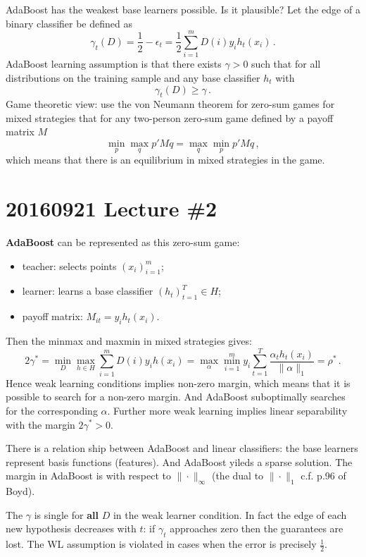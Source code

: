 \documentclass[a4paper]{article}
\begin{document}
AdaBoost has the weakest base learners possible. Is it plausible? Let the edge of
a binary classifier be defined as 
\[\gamma_t(D)
    = \frac{1}{2} - \epsilon_t
    = \frac{1}{2} \sum_{i=1}^m D(i) y_i h_t(x_i)
    \,.\]
AdaBoost learning assumption is that there exists $\gamma>0$ such that for all
distributions on the training sample and any base classifier $h_t$ with 
\[\gamma_t(D) \geq \gamma \,.\]
Game theoretic view: use the von Neumann theorem for zero-sum games for mixed strategies
that for any two-person zero-sum game defined by a payoff matrix $M$
\[\min_p \max_q p'Mq = \max_q \min_p p'Mq \,, \]
which means that there is an equilibrium in mixed strategies in the game.



\section{20160921 Lecture \#2} %
\label{sec:20160921_lecture_2}

\textbf{AdaBoost} can be represented as this zero-sum game:
\begin{itemize}
    \item teacher: selects points $(x_i)_{i=1}^m$;
    \item learner: learns a base classifier $(h_t)_{t=1}^T \in H$;
    \item payoff matrix: $M_{it} = y_i h_t(x_i)$.
\end{itemize}
Then the minmax and maxmin in mixed strategies gives:
\[ 2\gamma^*
    = \min_D \max_{h\in H} \sum_{i=1}^m D(i) y_i h(x_i)
    = \max_\alpha \min_{i=1}^m y_i \sum_{t=1}^T \frac{\alpha_t h_t(x_i) }{\|\alpha\|_1}
    = \rho^*
    \,.\]
Hence weak learning conditions implies non-zero margin, which means that it is possible
to search for a non-zero margin. And AdaBoost suboptimally searches for the corresponding
$\alpha$. Further more weak learning implies linear separability with the margin
$2\gamma^* > 0$.

There is a relation ship between AdaBoost and linear classifiers: the base learners
represent basis functions (features). And AdaBoost yileds a sparse solution. The
margin in AdaBoost is with respect to $\|\cdot\|_\infty$ (the dual to $\|\cdot\|_1$
c.f. p.96 of Boyd).

The $\gamma$ is single for \textbf{all} $D$ in the weak learner condition. In fact
the edge of each new hypothesis decreases with $t$: if $\gamma_t$ approaches zero
then the guarantees are lost. The WL assumption is violated in cases when the error
is precisely $\frac{1}{2}$.
\end{document}
